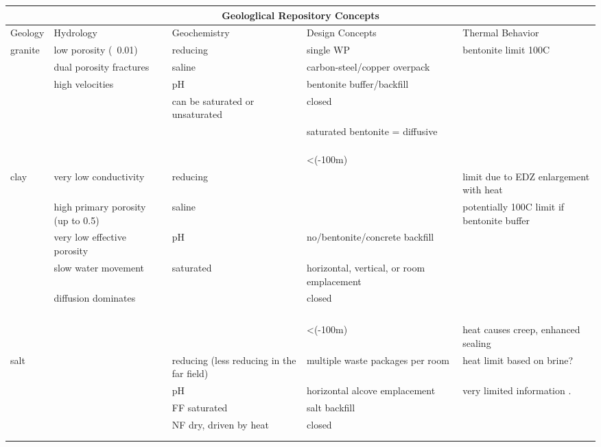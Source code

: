 %
\begin{table}[h!]
  \centering
  \footnotesize{
  \begin{tabularx}{\textwidth}{|l|X|X|X|X|}
    \multicolumn{5}{c}{\textbf{Geologlical Repository Concepts}}\\
    \hline
    Geology & Hydrology & Geochemistry & Design Concepts & Thermal Behavior \\ 
    \hline
    granite&low porosity (~0.01)&reducing&single WP&bentonite limit 100C\\
    &dual porosity fractures&saline&carbon-steel/copper overpack&\\
    &high velocities&pH&bentonite buffer/backfill&\\
    &&can be saturated or unsaturated&closed&\\
    &&&saturated bentonite = diffusive&\\
    &&&&\\
    &&&&\\
    &&&&\\
    &&&<(-100m)&\\
    clay&very low conductivity&reducing&&limit due to EDZ enlargement with heat\\
    &high primary porosity (up to 0.5)&saline&&potentially 100C limit if bentonite buffer\\
    &very low effective porosity&pH&no/bentonite/concrete backfill&\\
    &slow water movement&saturated&horizontal, vertical, or room emplacement&\\
    &diffusion dominates&&closed&\\
    &&&&\\
    &&&&\\
    &&&&\\
    &&&&\\
    &&&<(-100m)&heat causes creep, enhanced sealing\\
    salt&&reducing (less reducing in the far field)& multiple waste packages per room&heat limit based on brine?\\
    &&pH&horizontal alcove emplacement&very limited information .\\
    &&FF saturated&salt backfill&\\
    &&NF dry, driven by heat &closed&\\
    &&&&\\
    &&&&\\

\end{tabularx}}
\end{table}

